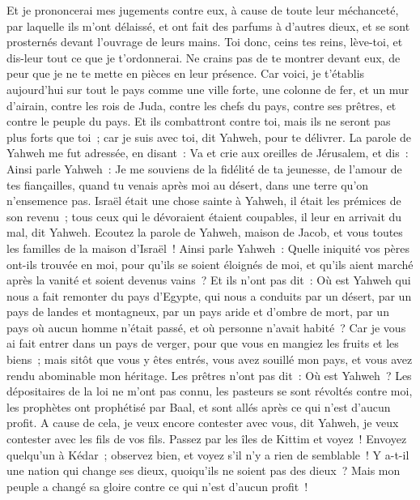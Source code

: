 \begin{multicols}{2}
Et je prononcerai mes jugements contre eux, à cause de toute leur méchanceté, par laquelle ils m'ont délaissé, et ont fait des parfums à d'autres dieux, et se sont prosternés devant l'ouvrage de leurs mains. 
Toi donc, ceins tes reins, lève-toi, et dis-leur tout ce que je t'ordonnerai. Ne crains pas de te montrer devant eux, de peur que je ne te mette en pièces en leur présence.
Car voici, je t'établis aujourd'hui sur tout le pays comme une ville forte, une colonne de fer, et un mur d'airain, contre les rois de Juda, contre les chefs du pays, contre ses prêtres, et contre le peuple du pays.
Et ils combattront contre toi, mais ils ne seront pas plus forts que toi~; car je suis avec toi, dit Yahweh, pour te délivrer.
\VerseOne{}La parole de Yahweh me fut adressée, en disant~:
Va et crie aux oreilles de Jérusalem, et dis~: Ainsi parle Yahweh~: Je me souviens de la fidélité de ta jeunesse, de l'amour de tes fiançailles, quand tu venais après moi au désert, dans une terre qu'on n'ensemence pas. 
Israël était une chose sainte à Yahweh, il était les prémices de son revenu~; tous ceux qui le dévoraient étaient coupables, il leur en arrivait du mal, dit Yahweh.
Ecoutez la parole de Yahweh, maison de Jacob, et vous toutes les familles de la maison d'Israël~!
Ainsi parle Yahweh~: Quelle iniquité vos pères ont-ils trouvée en moi, pour qu'ils se soient éloignés de moi, et qu'ils aient marché après la vanité et soient devenus vains~?
Et ils n'ont pas dit~: Où est Yahweh qui nous a fait remonter du pays d'Egypte, qui nous a conduits par un désert, par un pays de landes et montagneux, par un pays aride et d'ombre de mort, par un pays où aucun homme n'était passé, et où personne n'avait habité~? 
Car je vous ai fait entrer dans un pays de verger, pour que vous en mangiez les fruits et les biens~; mais sitôt que vous y êtes entrés, vous avez souillé mon pays, et vous avez rendu abominable mon héritage.
Les prêtres n'ont pas dit~: Où est Yahweh~? Les dépositaires de la loi ne m'ont pas connu, les pasteurs se sont révoltés contre moi, les prophètes ont prophétisé par Baal, et sont allés après ce qui n'est d'aucun profit.
A cause de cela, je veux encore contester avec vous, dit Yahweh, je veux contester avec les fils de vos fils.
Passez par les îles de Kittim et voyez~! Envoyez quelqu'un à Kédar~; observez bien, et voyez s'il n'y a rien de semblable~!
Y a-t-il une nation qui change ses dieux, quoiqu'ils ne soient pas des dieux~? Mais mon peuple a changé sa gloire contre ce qui n'est d'aucun profit~!

\end{multicols}
